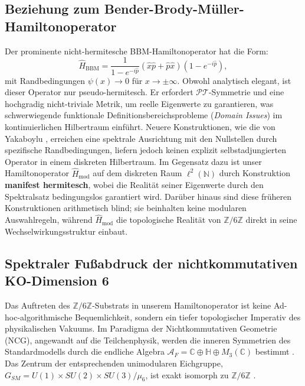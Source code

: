 \documentclass[aps,prl,preprint,superscriptaddress,floatfix]{revtex4-2}
\newcommand{\Zmod}{\mathbb{Z}/6\mathbb{Z}}
\begin{document}
\subsection{Beziehung zum Bender-Brody-Müller-Hamiltonoperator}

Der prominente nicht-hermitesche BBM-Hamiltonoperator \cite{Bender2017} hat die Form:
\begin{equation}
\hat{H}_{\text{BBM}} = \frac{1}{1 - e^{-i\hat{p}}} (\hat{x}\hat{p} + \hat{p}\hat{x}) (1 - e^{-i\hat{p}}),
\end{equation}
mit Randbedingungen $\psi(x) \to 0$ für $x \to \pm\infty$. Obwohl analytisch elegant, ist dieser Operator nur pseudo-hermitesch. Er erfordert $\mathcal{PT}$-Symmetrie und eine hochgradig nicht-triviale Metrik, um reelle Eigenwerte zu garantieren, was schwerwiegende funktionale Definitionsbereichsprobleme (\textit{Domain Issues}) im kontinuierlichen Hilbertraum einführt. Neuere Konstruktionen, wie die von Yakaboylu \cite{Yakaboylu2024}, erreichen eine spektrale Ausrichtung mit den Nullstellen durch spezifische Randbedingungen, liefern jedoch keinen explizit selbstadjungierten Operator in einem diskreten Hilbertraum. Im Gegensatz dazu ist unser Hamiltonoperator $\hat{H}_{\text{mod}}$ auf dem diskreten Raum $\ell^2(\mathbb{N})$ durch Konstruktion \textbf{manifest hermitesch}, wobei die Realität seiner Eigenwerte durch den Spektralsatz bedingungslos garantiert wird. Darüber hinaus sind diese früheren Konstruktionen arithmetisch blind; sie beinhalten keine modularen Auswahlregeln, während $\hat{H}_{\text{mod}}$ die topologische Realität von $\Zmod$ direkt in seine Wechselwirkungsstruktur einbaut.

\subsection{Spektraler Fußabdruck der nichtkommutativen KO-Dimension 6}

Das Auftreten des $\mathbb{Z}/6\mathbb{Z}$-Substrats in unserem Hamiltonoperator ist keine Ad-hoc-algorithmische Bequemlichkeit, sondern ein tiefer topologischer Imperativ des physikalischen Vakuums. Im Paradigma der Nichtkommutativen Geometrie (NCG), angewandt auf die Teilchenphysik, werden die inneren Symmetrien des Standardmodells durch die endliche Algebra $\mathcal{A}_F = \mathbb{C} \oplus \mathbb{H} \oplus M_3(\mathbb{C})$ bestimmt \cite{Chamseddine2007, Connes2008}. Das Zentrum der entsprechenden unimodularen Eichgruppe, $G_{SM} = U(1) \times SU(2) \times SU(3) / \mu_6$, ist exakt isomorph zu $\mathbb{Z}/6\mathbb{Z}$ \cite{Connes2008}.
\end{document}
